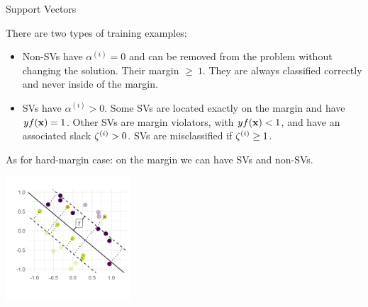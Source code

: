 \documentclass[11pt,compress,t,notes=noshow, xcolor=table]{beamer}
\begin{document}
\begin{vbframe}{Support Vectors}

\begin{small}
  There are two types of training examples:


\begin{itemize}
    \item Non-SVs have $\alpha^{(i)} = 0$ and can be
    removed from the problem without changing the solution. Their margin $\geq ~ 1.$ 
    They are always classified correctly and never inside of the margin. 
    
    \item SVs have $\alpha^{(i)} > 0.$ 
    Some SVs are located exactly on the
    margin and have $yf(\mathbf{x})=1$. Other SVs are margin violators, with $yf(\mathbf{x}) < 1$, 
     and have an associated
     slack $\zeta^{(i)} > 0$. 
     SVs are misclassified if $\zeta^{(i)} \geq 1$.
\end{itemize}
\end{small}
As for hard-margin case: on the margin we can have SVs and non-SVs.

\vspace{0.1cm}
\begin{center}
\includegraphics[width = 0.35\textwidth ]{figure/soft_margin_svs.png} \\
\end{center}
\end{vbframe}










\endlecture
\end{document}
